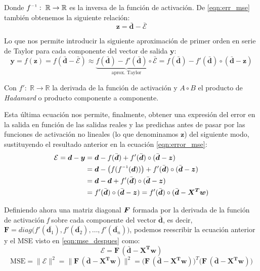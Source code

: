 \documentclass[00-Trabajo_Final.tex]{subfiles}
\begin{document}
\noindent Donde $f\inv:\;\mathbb{R}\rightarrow\mathbb{R}$ es la inversa de la función de activación. De \eqref{eqn:err_mse} también obtenemos la siguiente relación:
\begin{equation}
   \boldsymbol{z} = \bar{\boldsymbol{d}} - \bar{\mathcal{E}}
\end{equation}

\noindent Lo que nos permite introducir la siguiente aproximación de primer orden en serie de Taylor para cada componente del vector de salida $\boldsymbol{y}$:
\begin{equation}
    \boldsymbol{y} = f(\boldsymbol{z}) = f(\boldsymbol{\bar{d}-\bar{\mathcal{E}}}) \approx \underbrace{f(\boldsymbol{\bar{d}}) - f'(\boldsymbol{\bar{d}}) \circ \boldsymbol{\bar{\mathcal{E}}}}_\text{aprox. Taylor} = f(\boldsymbol{\bar{d}}) - f'(\boldsymbol{\bar{d}}) \circ (\bar{\boldsymbol{d}} - \boldsymbol{z})
\end{equation}

\noindent Con $f':\;\mathbb{R}\rightarrow\mathbb{R}$ la derivada de la función de activación y $ A \circ B$ el producto de \textit{Hadamard} o producto componente a componente.

\vspace{0.5em}

Esta última ecuación nos permite, finalmente, obtener una expresión del error en la salida en función de las salidas reales y las predichas antes de pasar por las funciones de activación no lineales (lo que denominamos $\boldsymbol{z}$) del siguiente modo, sustituyendo el resultado anterior en la ecuación \eqref{eqn:error_mse}:
\begin{align}
    \mathcal{E} = \boldsymbol{d} - \boldsymbol{y}  &= \boldsymbol{d} - f(\bar{\boldsymbol{d}}) + f'(\bar{\boldsymbol{d}})\circ(\bar{\boldsymbol{d}} - \bsym{z}) \nonumber \\
    &= \boldsymbol{d} - \bigl(f(f\inv(\boldsymbol{d}))\bigr) + f'(\bar{\boldsymbol{d}})\circ(\bar{\boldsymbol{d}} - \bsym{z}) \nonumber \\
    &= \boldsymbol{d} - \boldsymbol{d} + f'(\bar{\boldsymbol{d}})\circ(\bar{\boldsymbol{d}} - \bsym{z}) \nonumber \\
    &= f'(\bar{\boldsymbol{d}})\circ(\bar{\boldsymbol{d}} - \bsym{z}) = f'(\bar{\boldsymbol{d}})\circ(\bar{\boldsymbol{d}} - \boldsymbol{X^T w}) 
\end{align}

Definiendo ahora una matriz diagonal $\boldsymbol{F}$ formada por la derivada de la función de activación \textit{f} sobre cada componente del vector $\bar{\boldsymbol{d}}$, es decir, $\boldsymbol{F} = diag\bigl(f'(\bar{\boldsymbol{d}_1}), f'(\bar{\boldsymbol{d}_2}), \ldots, f'(\bar{\boldsymbol{d}_n})\bigr)$, podemos reescribir la ecuación anterior y el MSE visto en \eqref{eqn:mse_despues} como:
\[
    \mathcal{E} = \boldsymbol{F}\,(\bar{\boldsymbol{d}} - \boldsymbol{X^T w})
\]
\begin{equation}\label{eqn:mse_final}
    \text{MSE} = \|\mathcal{E}\|^2 = \|\boldsymbol{F}\,(\bar{\boldsymbol{d}} - \boldsymbol{X^T w})\|^2 = \bigl( \boldsymbol{F} \, (\bar{\boldsymbol{d}} - \boldsymbol{X^T w})\bigr)^T  \bigl(\boldsymbol{F} \, (\bar{\boldsymbol{d}} - \boldsymbol{X^T w})\bigr)
\end{equation}
\end{document}
